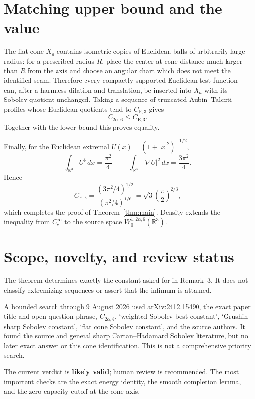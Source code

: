 \documentclass[11pt]{article}
\newcommand{\R}{\mathbb R}
\begin{document}
\section*{Matching upper bound and the value}

The flat cone $X_a$ contains isometric copies of Euclidean balls of
arbitrarily large radius: for a prescribed radius $R$, place the center at
cone distance much larger than $R$ from the axis and choose an angular chart
which does not meet the identified seam.  Therefore every compactly
supported Euclidean test function can, after a harmless dilation and
translation, be inserted into $X_a$ with its Sobolev quotient unchanged.
Taking a sequence of truncated Aubin--Talenti profiles whose Euclidean
quotients tend to $C_{\mathrm E,3}$ gives
\[
 C_{2\alpha,6}\le C_{\mathrm E,3}.
\]
Together with the lower bound this proves equality.

Finally, for the Euclidean extremal $U(x)=(1+|x|^2)^{-1/2}$,
\[
 \int_{\R^3}U^6\,dx=\frac{\pi^2}{4},
 \qquad
 \int_{\R^3}|\nabla U|^2\,dx=\frac{3\pi^2}{4}.
\]
Hence
\[
 C_{\mathrm E,3}
 =\frac{(3\pi^2/4)^{1/2}}{(\pi^2/4)^{1/6}}
 =\sqrt3\left(\frac{\pi}{2}\right)^{2/3},
\]
which completes the proof of Theorem~\ref{thm:main}.  Density extends the
inequality from $C_c^\infty$ to the source space
$W^{1,2\alpha,6}_0(\R^3)$.

\section*{Scope, novelty, and review status}

The theorem determines exactly the constant asked for in Remark~3.  It does
not classify extremizing sequences or assert that the infimum is attained.

A bounded search through 9 August 2026 used arXiv:2412.15490, the exact
paper title and open-question phrase, $C_{2\alpha,6}$, `weighted Sobolev best
constant', `Grushin sharp Sobolev constant', `flat cone Sobolev constant',
and the source authors.  It found the source and general sharp
Cartan--Hadamard Sobolev literature, but no later exact answer or this cone
identification.  This is not a comprehensive priority search.

The current verdict is \textbf{likely valid}; human review is recommended.
The most important checks are the exact energy identity, the smooth
completion lemma, and the zero-capacity cutoff at the cone axis.
\end{document}
